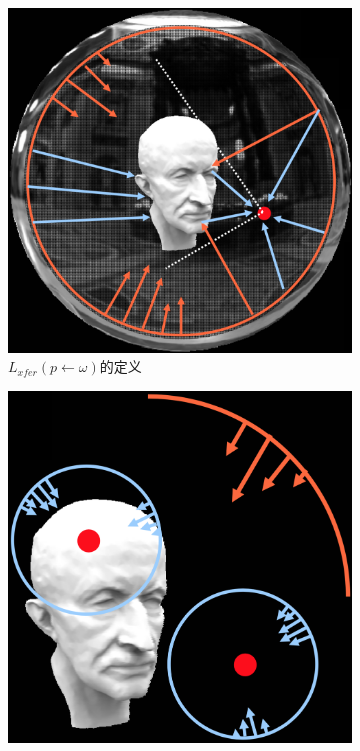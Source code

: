\begin{figure}
	\begin{subfigure}[b]{0.505\textwidth}
		\includegraphics[width=\textwidth]{figures/prt/prt-8-2}
		\caption{$L_{xfer}(p\leftarrow \omega)$的定义}
	\end{subfigure}
		\begin{subfigure}[b]{0.495\textwidth}
		\includegraphics[width=\textwidth]{figures/prt/prt-9}

\end{subfigure}
\end{figure}
